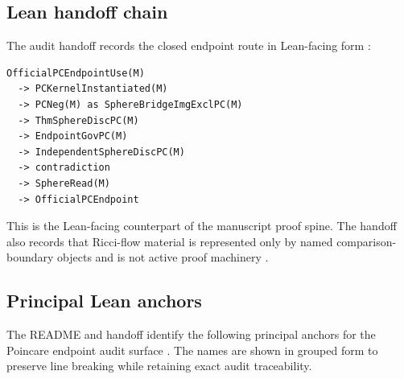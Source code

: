 \documentclass[11pt]{article}
\begin{document}
\subsection*{Lean handoff chain}
{}

The audit handoff records the closed endpoint route in Lean-facing form \cite{PoincareLeanAuditHandoff2026}:
\begin{verbatim}
OfficialPCEndpointUse(M)
  -> PCKernelInstantiated(M)
  -> PCNeg(M) as SphereBridgeImgExclPC(M)
  -> ThmSphereDiscPC(M)
  -> EndpointGovPC(M)
  -> IndependentSphereDiscPC(M)
  -> contradiction
  -> SphereRead(M)
  -> OfficialPCEndpoint
\end{verbatim}
This is the Lean-facing counterpart of the manuscript proof spine. The handoff also records that Ricci-flow material is represented only by named comparison-boundary objects and is not active proof machinery \cite{PoincareLeanAuditHandoff2026}.

\subsection*{Principal Lean anchors}
{}

The README and handoff identify the following principal anchors for the Poincare endpoint audit surface \cite{PoincareLeanAuditGithub2026,PoincareLeanAuditHandoff2026}. The names are shown in grouped form to preserve line breaking while retaining exact audit traceability.
\end{document}
